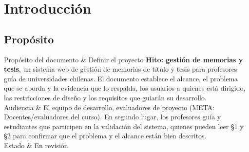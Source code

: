\documentclass[10pt,a4paper]{article}
\newcommand{\nota}[1]{{\small\itshape\color{nota}#1\par}}
\newenvironment{kv}[1][4.6cm]
  {\footnotesize\setlength{\extrarowheight}{3pt}\xltabular{\linewidth}{|E{#1}|L|}\hline}
  {\endxltabular}
\newcommand{\kvrow}[2]{#1 & #2 \\ \hline}
\begin{document}
\newpage
\section{Introducción}
\providecommand{\sistema}{\textbf{Hito: gestión de memorias y tesis}}

\subsection{Propósito}
\begin{kv}
\kvrow{Propósito del documento}{Definir el proyecto \sistema, un sistema web de gestión de memorias de título y tesis para profesores guía de universidades chilenas. El documento establece el alcance, el problema que se aborda y la evidencia que lo respalda, los usuarios a quienes está dirigido, las restricciones de diseño y los requisitos que guiarán su desarrollo.}
\kvrow{Audiencia}{El equipo de desarrollo, evaluadores de proyecto (META: Docentes/evaluadores del curso). En segundo lugar, los profesores guía y estudiantes que participen en la validación del sistema, quienes pueden leer §1 y §2 para confirmar que el problema y el alcance están bien descritos.}
\kvrow{Estado}{En revisión}
\end{kv}
\end{document}
